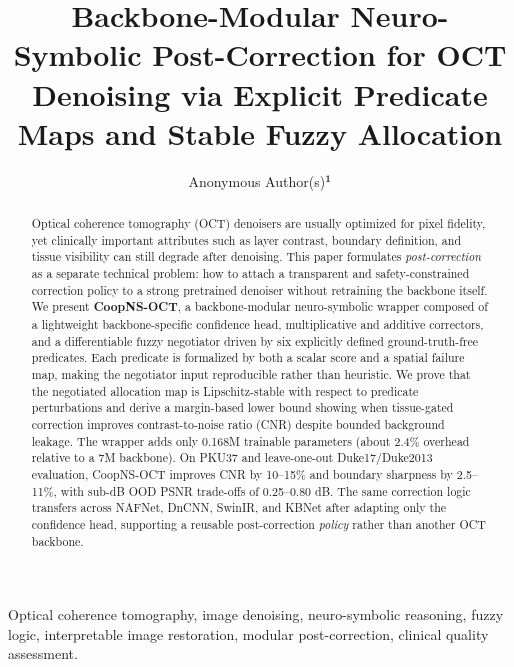\documentclass{ieeetj}
\def\authorrefmark#1{\ensuremath{^{\textbf{#1}}}}
\begin{document}
\receiveddate{}
\reviseddate{}
\accepteddate{}
\publisheddate{}
\currentdate{}
\doiinfo{}
\title{Backbone-Modular Neuro-Symbolic Post-Correction for OCT Denoising via Explicit Predicate Maps and Stable Fuzzy Allocation}
\author{Anonymous Author(s)\authorrefmark{1}}
\affil{\authorrefmark{1} Anonymous Affiliation}

\begin{abstract}
Optical coherence tomography (OCT) denoisers are usually optimized for pixel fidelity, yet clinically important attributes such as layer contrast, boundary definition, and tissue visibility can still degrade after denoising. This paper formulates \emph{post-correction} as a separate technical problem: how to attach a transparent and safety-constrained correction policy to a strong pretrained denoiser without retraining the backbone itself. We present \textbf{CoopNS-OCT}, a backbone-modular neuro-symbolic wrapper composed of a lightweight backbone-specific confidence head, multiplicative and additive correctors, and a differentiable fuzzy negotiator driven by six explicitly defined ground-truth-free predicates. Each predicate is formalized by both a scalar score and a spatial failure map, making the negotiator input reproducible rather than heuristic. We prove that the negotiated allocation map is Lipschitz-stable with respect to predicate perturbations and derive a margin-based lower bound showing when tissue-gated correction improves contrast-to-noise ratio (CNR) despite bounded background leakage. The wrapper adds only 0.168M trainable parameters (about 2.4\% overhead relative to a 7M backbone). On PKU37 and leave-one-out Duke17/Duke2013 evaluation, CoopNS-OCT improves CNR by 10--15\% and boundary sharpness by 2.5--11\%, with sub-dB OOD PSNR trade-offs of 0.25--0.80 dB. The same correction logic transfers across NAFNet, DnCNN, SwinIR, and KBNet after adapting only the confidence head, supporting a reusable post-correction \emph{policy} rather than another OCT backbone.
\end{abstract}

\begin{IEEEkeywords}
Optical coherence tomography, image denoising, neuro-symbolic reasoning, fuzzy logic, interpretable image restoration, modular post-correction, clinical quality assessment.
\end{IEEEkeywords}

\end{document}
